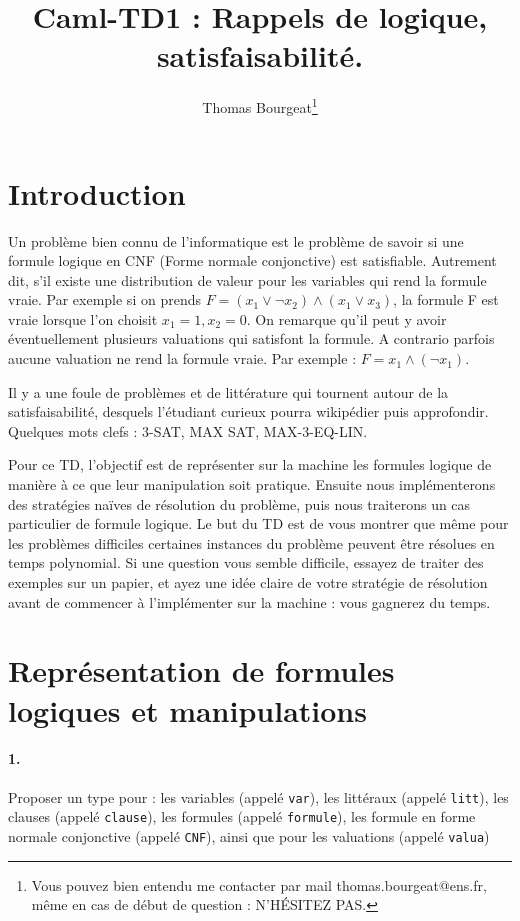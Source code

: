 \documentclass[10pt,a4paper]{article}
\begin{document}
\title{Caml-TD1 : Rappels de logique, satisfaisabilité.}
\author{Thomas Bourgeat\footnote{Vous pouvez bien entendu me contacter par mail thomas.bourgeat@ens.fr, même en cas de début de question : N'HÉSITEZ PAS.}}
\maketitle{}

\section{Introduction}
Un problème bien connu de l'informatique est le problème de savoir si une formule logique en CNF (Forme normale conjonctive) est satisfiable. Autrement dit, s'il existe une distribution de valeur pour les variables qui rend la formule vraie. Par exemple si on prends $F=(x_1\lor \neg x_2)\land(x_1\lor x_3)$, la formule F est vraie lorsque l'on choisit $x_1=1,x_2=0$. On remarque qu'il peut y avoir éventuellement plusieurs valuations qui satisfont la formule. A contrario parfois aucune valuation ne rend la formule vraie. Par exemple : $F=x_1\land (\neg x_1)$. 

Il y a une foule de problèmes et de littérature qui tournent autour de la satisfaisabilité, desquels l'étudiant curieux pourra wikipédier puis approfondir. Quelques mots clefs : 3-SAT, MAX SAT, MAX-3-EQ-LIN.

Pour ce TD, l'objectif est de représenter sur la machine les formules logique de manière à ce que leur manipulation soit pratique. Ensuite nous implémenterons des stratégies naïves de résolution du problème, puis nous traiterons un cas particulier de formule logique. Le but du TD est de vous montrer que même pour les problèmes difficiles certaines instances du problème peuvent être résolues en temps polynomial. Si une question vous semble difficile, essayez de traiter des exemples sur un papier, et ayez une idée claire de votre stratégie de résolution avant de commencer à l'implémenter sur la machine : vous gagnerez du temps.

\section{Représentation de formules logiques et manipulations}

\paragraph{1.} Proposer un type pour : les variables (appelé \texttt{var}), les littéraux (appelé \texttt{litt}), les clauses (appelé \texttt{clause}), les formules (appelé \texttt{formule}), les formule en forme normale conjonctive (appelé \texttt{CNF}), ainsi que pour les valuations (appelé \texttt{valua})
\end{document}
